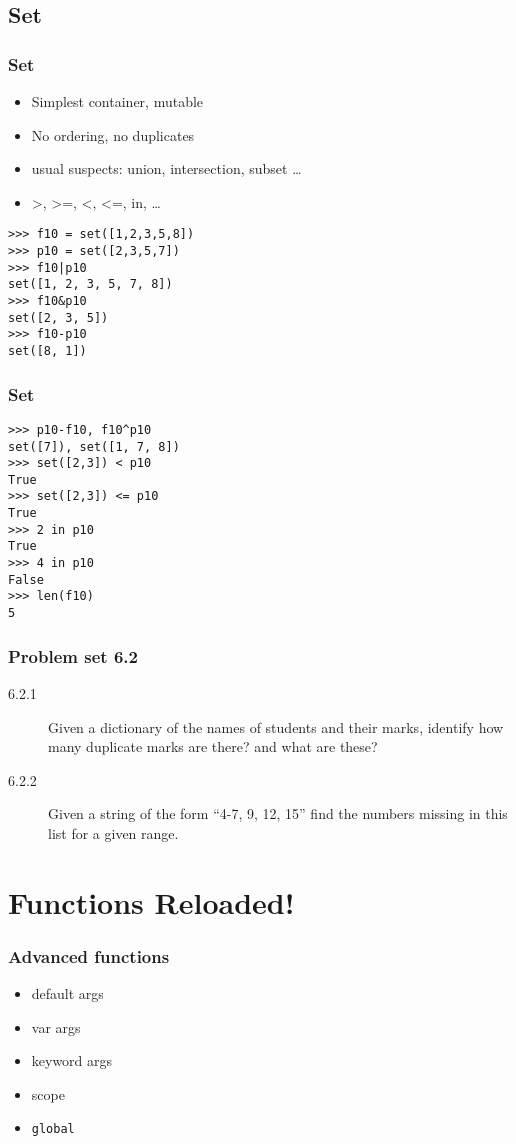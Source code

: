 \documentclass[14pt,compress]{beamer}
\newcounter{time}
\newcommand{\inctime}[1]{\addtocounter{time}{#1}{\tiny \thetime\ m}}
\newcommand{\typ}[1]{\texttt{#1}}
\begin{document}
\subsection{Set}
\begin{frame}[fragile]
  \frametitle{Set}
    \begin{itemize}
      \item Simplest container, mutable
      \item No ordering, no duplicates
      \item usual suspects: union, intersection, subset \ldots
      \item >, >=, <, <=, in, \ldots
    \end{itemize}
    \begin{lstlisting}
>>> f10 = set([1,2,3,5,8])
>>> p10 = set([2,3,5,7])
>>> f10|p10
set([1, 2, 3, 5, 7, 8])
>>> f10&p10
set([2, 3, 5])
>>> f10-p10
set([8, 1])
\end{lstlisting}
\end{frame}

\begin{frame}[fragile]
  \frametitle{Set}
    \begin{lstlisting}
>>> p10-f10, f10^p10
set([7]), set([1, 7, 8])
>>> set([2,3]) < p10
True
>>> set([2,3]) <= p10
True
>>> 2 in p10
True
>>> 4 in p10
False
>>> len(f10)
5
\end{lstlisting}
\inctime{5}
\end{frame}

\begin{frame}
  \frametitle{Problem set 6.2}
  \begin{description}
    \item[6.2.1] Given a dictionary of the names of students and their marks, identify how many duplicate marks are there? and what are these?
    \item[6.2.2] Given a string of the form ``4-7, 9, 12, 15'' find the numbers missing in this list for a given range.
\end{description}
\inctime{10}
\end{frame}


\section{Functions Reloaded!}
\begin{frame}[fragile]
    \frametitle{Advanced functions}
    \begin{itemize}
        \item default args
        \item var args
        \item keyword args
        \item scope
        \item \typ{global}
      \end{itemize}
\end{frame}
\end{document}

